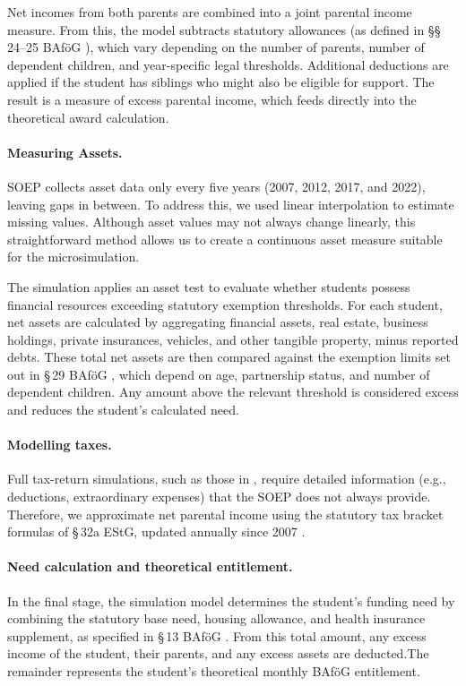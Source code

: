 Net incomes from both parents are combined into a joint parental income measure. 
From this, the model subtracts statutory allowances (as defined in §§\,24–25 BAföG \citep{bafoeg_law}), which vary depending on the number of parents, number of dependent children, and year-specific legal thresholds. 
Additional deductions are applied if the student has siblings who might also be eligible for support. 
The result is a measure of excess parental income, which feeds directly into the theoretical award calculation.


\paragraph{Measuring Assets.}
SOEP collects asset data only every five years (2007, 2012, 2017, and 2022), leaving gaps in between. 
To address this, we used linear interpolation to estimate missing values. 
Although asset values may not always change linearly, this straightforward method allows us to create a continuous asset measure suitable for the microsimulation.

The simulation applies an asset test to evaluate whether students possess financial resources exceeding statutory exemption thresholds. 
For each student, net assets are calculated by aggregating financial assets, real estate, business holdings, private insurances, vehicles, and other tangible property, minus reported debts. 
These total net assets are then compared against the exemption limits set out in §\,29 BAföG \citep{bafoeg_law}, which depend on age, partnership status, and number of dependent children. 
Any amount above the relevant threshold is considered excess and reduces the student's calculated need.

\paragraph{Modelling taxes.}
Full tax-return simulations, such as those in \cite{herber_non-take-up_2019}, require detailed information (e.g., deductions, extraordinary expenses) that the SOEP does not always provide.  
Therefore, we approximate net parental income using the statutory tax bracket formulas of §\,32a EStG, updated annually since 2007 \citep{estg_law,estg_2025,estg_2024,estg_2023,estg_2022,estg_2021,estg_2020,estg_2019,estg_2018,estg_2017,estg_2016,estg_2015,estg_2014,estg_2013,estg_2012,estg_2007,estg_2006}.

\paragraph{Need calculation and theoretical entitlement.}
In the final stage, the simulation model determines the student's funding need by combining the statutory base need, housing allowance, and health insurance supplement, as specified in §\,13 BAföG \cite{bafoeg_law}. 
From this total amount, any excess income of the student, their parents, and any excess assets are deducted.The remainder represents the student's theoretical monthly BAföG entitlement. 

